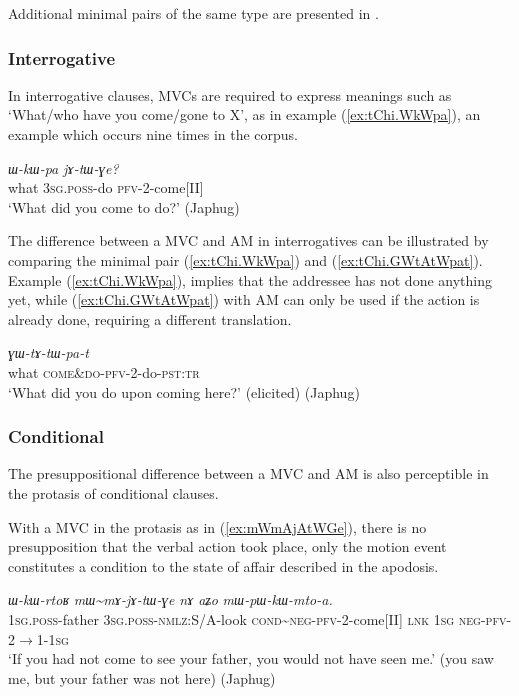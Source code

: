 \documentclass[oneside,a4paper,11pt]{article}
\newcommand{\ipa}[1]{{\phon\textit{#1}}}
\newcommand{\redp}{\textasciitilde}
\newcommand{\rouge}[1]{{\color{red}#1}}
\newcommand{\fl}{$\rightarrow$}
\begin{document}
Additional minimal pairs of the same type are presented in \citet[202-203]{jacques13harmonization}.


\subsubsection{Interrogative} \label{sec:am.interrogative}
In interrogative clauses, MVCs are required to express meanings such as `What/who have you come/gone to X', as in example (\ref{ex:tChi.WkWpa}), an example which occurs nine times in the corpus.

\begin{exe}
\ex \label{ex:tChi.WkWpa}
\gll \ipa{tɕʰi}	\ipa{ɯ-kɯ-pa}	\ipa{jɤ-tɯ-ɣe?}\\
what \textsc{3sg.poss}-do \textsc{pfv}-2-come[II] \\
\glt `What did you come to do?'  (Japhug)
\end{exe}

The difference between a MVC and AM in interrogatives can be illustrated by comparing the minimal pair  (\ref{ex:tChi.WkWpa}) and (\ref{ex:tChi.GWtAtWpat}). Example (\ref{ex:tChi.WkWpa}),  implies that the addressee has not done anything yet, while (\ref{ex:tChi.GWtAtWpat}) with AM can only be used if the action is already done, requiring a different translation.

\begin{exe}
\ex \label{ex:tChi.GWtAtWpat}
\gll \ipa{tɕʰi}	\ipa{\rouge{ɣɯ}-tɤ-tɯ-pa-t}  \\
what \rouge{\textsc{come\&do}}-\textsc{pfv}-2-do-\textsc{pst:tr}    \\
\glt `What did you do upon coming here?' (elicited) (Japhug)
\end{exe}

 

\subsubsection{Conditional} \label{sec:am.conditional}
The presuppositional difference between a MVC and AM is also perceptible in the protasis of conditional clauses. 

With a MVC in the protasis as in (\ref{ex:mWmAjAtWGe}), there is no presupposition that the verbal action took place, only the motion event constitutes a condition to the state of affair described in the apodosis.

\begin{exe}
\ex \label{ex:mWmAjAtWGe}
\gll \ipa{nɤ-wa}	\ipa{ɯ-kɯ-rtoʁ}	\ipa{mɯ\redp{}mɤ-jɤ-tɯ-ɣe}	\ipa{nɤ}	\ipa{aʑo}	\ipa{mɯ-pɯ-kɯ-mto-a.}
 \\
\textsc{1sg.poss}-father \textsc{3sg.poss-}\textsc{nmlz}:S/A-look \textsc{cond}\redp{}\textsc{neg}-\textsc{pfv}-2-come[II] \textsc{lnk} \textsc{1sg} \textsc{neg}-\textsc{pfv}-2\fl{}1-\textsc{1sg} \\
\glt `If you had not come to see your father, you would not have seen me.' (you saw me, but your father was not here) (Japhug)
\end{exe}
\end{document}
